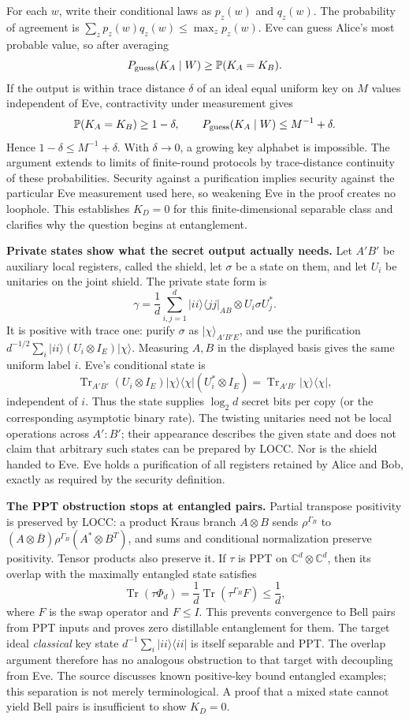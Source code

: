 \documentclass[11pt]{article}
\begin{document}
For each $w$, write their conditional laws as $p_z(w)$ and $q_z(w)$.
The probability of agreement is
$\sum_zp_z(w)q_z(w)\leq\max_zp_z(w)$.
Eve can guess Alice's most probable value, so after averaging
\[
 P_{\rm guess}(K_A\mid W)\geq\mathbb P(K_A=K_B).
\]
If the output is within trace distance $\delta$ of an ideal equal uniform
key on $M$ values independent of Eve, contractivity under measurement gives
\[
 \mathbb P(K_A=K_B)\geq1-\delta,\qquad
 P_{\rm guess}(K_A\mid W)\leq M^{-1}+\delta.
\]
Hence $1-\delta\leq M^{-1}+\delta$.  With $\delta\to0$, a growing key
alphabet is impossible.  The argument extends to limits of finite-round
protocols by trace-distance continuity of these probabilities.  Security
against a purification implies security against the particular Eve
measurement used here, so weakening Eve in the proof creates no loophole.
This establishes $K_D=0$ for this finite-dimensional separable class and
clarifies why the question begins at entanglement.

\textbf{Private states show what the secret output actually needs.}
Let $A'B'$ be auxiliary local registers, called the shield, let $\sigma$ be
a state on them, and let $U_i$ be unitaries on the joint shield.  The private
state form is
\[
 \gamma=\frac1d\sum_{i,j=1}^d|ii\rangle\langle jj|_{AB}
                         \otimes U_i\sigma U_j^*.
\]
It is positive with trace one: purify $\sigma$ as $|\chi\rangle_{A'B'E}$,
and use the purification
$d^{-1/2}\sum_i|ii\rangle(U_i\otimes I_E)|\chi\rangle$.
Measuring $A,B$ in the displayed basis gives the same uniform label $i$.
Eve's conditional state is
\[
 \operatorname{Tr}_{A'B'}(U_i\otimes I_E)
 |\chi\rangle\langle\chi|(U_i^*\otimes I_E)
 =\operatorname{Tr}_{A'B'}|\chi\rangle\langle\chi|,
\]
independent of $i$.  Thus the state supplies $\log_2d$ secret bits per copy
(or the corresponding asymptotic binary rate).  The twisting unitaries need
not be local operations across $A':B'$; their appearance describes the given
state and does not claim that arbitrary such states can be prepared by LOCC.
Nor is the shield handed to Eve.  Eve holds a purification of all registers
retained by Alice and Bob, exactly as required by the security definition.

\textbf{The PPT obstruction stops at entangled pairs.}
Partial transpose positivity is preserved by LOCC: a product Kraus branch
$A\otimes B$ sends $\rho^{\Gamma_B}$ to
$(A\otimes\overline B)\rho^{\Gamma_B}(A^*\otimes B^T)$, and sums and
conditional normalization preserve positivity.  Tensor products also preserve
it.  If $\tau$ is PPT on $\mathbb C^d\otimes\mathbb C^d$, then its overlap
with the maximally entangled state satisfies
\[
 \operatorname{Tr}(\tau\Phi_d)
 =\frac1d\operatorname{Tr}(\tau^{\Gamma_B}F)\leq\frac1d,
\]
where $F$ is the swap operator and $F\leq I$.  This prevents convergence to
Bell pairs from PPT inputs and proves zero distillable entanglement for them.
The target ideal \emph{classical} key state
$d^{-1}\sum_i|ii\rangle\langle ii|$ is itself separable and PPT.
The overlap argument therefore has no analogous obstruction to that target
with decoupling from Eve.  The source discusses known positive-key bound
entangled examples; this separation is not merely terminological.  A proof
that a mixed state cannot yield Bell pairs is insufficient to show $K_D=0$.
\end{document}
